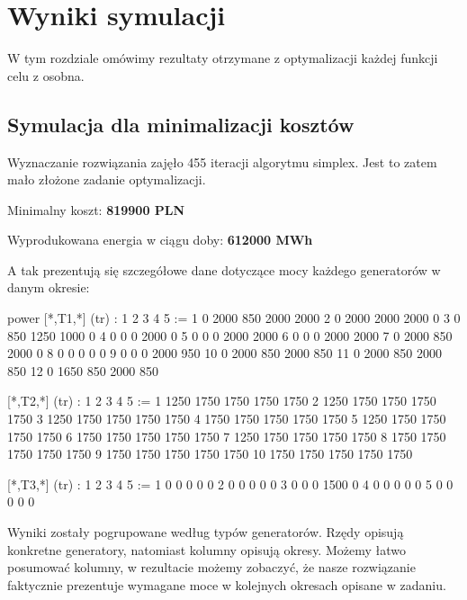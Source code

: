 \documentclass[12pt, twoside, hidelinks, a4paper]{article}
\begin{document}
\section{Wyniki symulacji}
W tym rozdziale omówimy rezultaty otrzymane z optymalizacji każdej funkcji celu z osobna.

\subsection{Symulacja dla minimalizacji kosztów} \label{sec:cost_min}
Wyznaczanie rozwiązania zajęło 455 iteracji algorytmu simplex. Jest to zatem mało złożone zadanie optymalizacji.

Minimalny koszt: \textbf{819900 PLN}

Wyprodukowana energia w ciągu doby: \textbf{612000 MWh}

A tak prezentują się szczegółowe dane dotyczące mocy każdego generatorów w danym okresie:

\begin{boxedverbatim}
power [*,T1,*] (tr)
:    1    2      3      4      5      :=
1    0   2000    850   2000   2000
2    0   2000   2000   2000      0
3    0    850   1250   1000      0
4    0      0      0   2000      0
5    0      0      0   2000   2000
6    0      0      0   2000   2000
7    0   2000    850   2000      0
8    0      0      0      0      0
9    0      0      0   2000    950
10   0   2000    850   2000    850
11   0   2000    850   2000    850
12   0   1650    850   2000    850

 [*,T2,*] (tr)
:     1      2      3      4      5      :=
1    1250   1750   1750   1750   1750
2    1250   1750   1750   1750   1750
3    1250   1750   1750   1750   1750
4    1750   1750   1750   1750   1750
5    1250   1750   1750   1750   1750
6    1750   1750   1750   1750   1750
7    1250   1750   1750   1750   1750
8    1750   1750   1750   1750   1750
9    1750   1750   1750   1750   1750
10   1750   1750   1750   1750   1750

 [*,T3,*] (tr)
:   1   2   3    4     5    :=
1   0   0   0      0   0
2   0   0   0      0   0
3   0   0   0   1500   0
4   0   0   0      0   0
5   0   0   0      0   0
\end{boxedverbatim}

Wyniki zostały pogrupowane według typów generatorów. Rzędy opisują konkretne generatory, natomiast kolumny opisują okresy. Możemy łatwo posumować kolumny, w rezultacie możemy zobaczyć, że nasze rozwiązanie faktycznie prezentuje wymagane moce w kolejnych okresach opisane w zadaniu.
\end{document}
